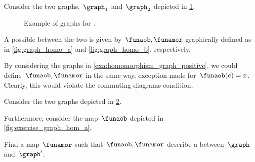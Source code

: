 \begin{example}
    \label{exa:homomorphism_graph_positive}
    Consider the two graphs,~$\graph_1$ and~$\graph_2$ depicted in \cref{fig:ex_graph_homom}.
    \begin{figure}[h]
        \centering
        \caption{Example of graphs for .}
        \label{fig:ex_graph_homom}
    \end{figure}

    \begin{marginfigure}
        \centering
        \caption{}
        \label{fig:graph_homo_a}
    \end{marginfigure}

    \begin{marginfigure}
        \centering
        \caption{}
        \label{fig:graph_homo_b}
    \end{marginfigure}
    A possible  between the two is given by~$\funaob,\funamor$ graphically defined as in \cref{fig:graph_homo_a} and \cref{fig:graph_homo_b}, respectively.
\end{example}

\begin{example}[Counterexample]
    By considering the graphs in \cref{exa:homomorphism_graph_positive}, we could define~$\funaob,\funamor$ in the same way, exception made for~$\funaob(e)=x$.
    Clearly, this would violate the commuting diagrams condition.
\end{example}

\begin{exercise}
    Consider the two graphs depicted in \cref{fig:ex_graph_hom}.
    \begin{figure}[h]
        \centering
        \caption{
            \label{fig:ex_graph_hom}}
    \end{figure}
    \begin{marginfigure}
        \centering
        \caption{}
        \label{fig:exercise_graph_hom_a}
    \end{marginfigure}
    Furthermore, consider the map~$\funaob$ depicted in \cref{fig:exercise_graph_hom_a}.

    Find a map~$\funamor$ such that~$\funaob,\funamor$ describe a  between~$\graph$ and~$\graph'$.
\end{exercise}

